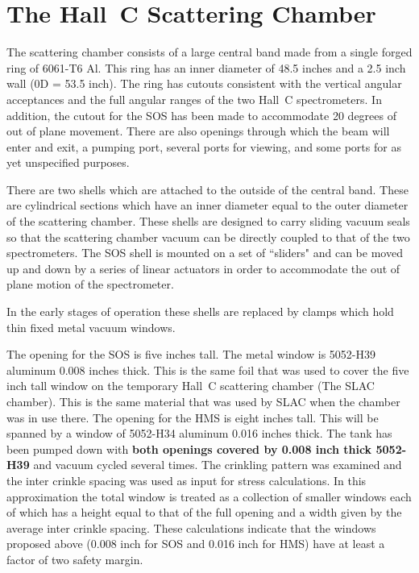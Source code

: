 \section{The Hall~C Scattering Chamber}

The scattering chamber consists of a large central band made from a single
forged ring of 6061-T6 Al. This ring has an inner diameter of
48.5 inches and a  2.5 inch wall (0D = 53.5 inch). The ring has
cutouts consistent with the vertical angular acceptances and the
full angular ranges of the two Hall~C spectrometers. In addition,
the cutout for the SOS has been made to accommodate 20 degrees
of out of plane movement. There are also openings through which the beam
will enter and exit, a pumping port, several ports for viewing, and
some ports for as yet unspecified purposes.

There are two shells which are attached to the outside of the central
band. These are cylindrical sections which have an inner diameter
equal to the outer diameter of the scattering chamber. These shells
are designed to carry sliding vacuum seals so that the scattering
chamber vacuum can be directly coupled to that of the two spectrometers.
The SOS shell is mounted on a set of ``sliders" and can be moved
up and down by a series of linear actuators in order to accommodate the
out of plane motion of the spectrometer.

In the early stages of operation these shells are replaced by
clamps which hold thin fixed metal vacuum windows.

The opening for the SOS is five inches tall. The metal window is
5052-H39 aluminum 0.008 inches thick. This is the same foil that was used to
cover the five inch tall window on the temporary Hall~C scattering chamber
(The SLAC chamber). This is the same material that was used by SLAC when
the chamber was in use there.
The opening for the HMS
is eight inches tall. This will be spanned by a window of
5052-H34 aluminum 0.016 inches thick. The tank has been pumped down with
{\bf both openings covered by 0.008 inch thick 5052-H39 }
and vacuum cycled several
times. The crinkling pattern was examined and the inter crinkle spacing
was used as input for stress calculations. In this approximation the
total window is treated as a collection of smaller windows each of which
has a height equal to that of the full opening and a width given by the average
inter crinkle spacing. These calculations indicate that the windows
proposed above (0.008 inch for SOS and 0.016 inch for HMS) have at least
a factor of two safety margin.

